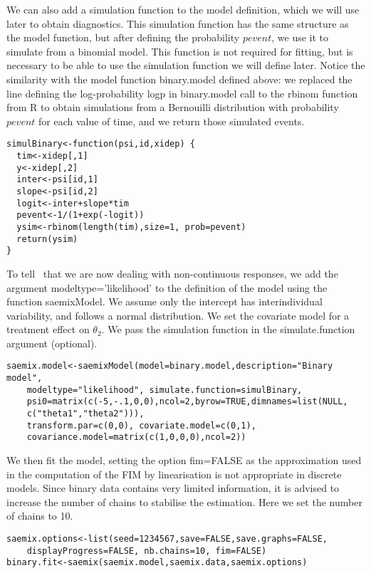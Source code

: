 We can also add a simulation function to the model definition, which we will use later to obtain diagnostics. This simulation function has the same structure as the model function, but after defining the probability $pevent$, we use it to simulate from a binomial model. This function is not required for fitting, but is necessary to be able to use the simulation function we will define later. Notice the similarity with the model function {\sf binary.model} defined above: we replaced the line defining the log-probability {\sf logp} in {\sf binary.model}  call to the {\sf rbinom} function from {\sf R} to obtain simulations from a Bernouilli distribution with probability $pevent$ for each value of time, and we return those simulated events.
\begin{verbatim}
simulBinary<-function(psi,id,xidep) {
  tim<-xidep[,1]
  y<-xidep[,2]
  inter<-psi[id,1]
  slope<-psi[id,2]
  logit<-inter+slope*tim
  pevent<-1/(1+exp(-logit))
  ysim<-rbinom(length(tim),size=1, prob=pevent)
  return(ysim)
}
\end{verbatim}

To tell \saemix~that we are now dealing with non-continuous responses, we add the argument {\sf modeltype='likelihood'} to the definition of the model using the function {\sf saemixModel}. We assume only the intercept has interindividual variability, and follows a normal distribution. We set the covariate model for a treatment effect on $\theta_2$. We pass the simulation function in the {\sf simulate.function} argument (optional).
\begin{verbatim}
saemix.model<-saemixModel(model=binary.model,description="Binary model",
    modeltype="likelihood", simulate.function=simulBinary,
    psi0=matrix(c(-5,-.1,0,0),ncol=2,byrow=TRUE,dimnames=list(NULL,
    c("theta1","theta2"))),
    transform.par=c(0,0), covariate.model=c(0,1),
    covariance.model=matrix(c(1,0,0,0),ncol=2))
\end{verbatim}

We then fit the model, setting the option {\sf fim=FALSE} as the approximation used in the computation of the FIM by linearisation is not appropriate in discrete models. Since binary data contains very limited information, it is advised to increase the number of chains to stabilise the estimation. Here we set the number of chains to 10.
\begin{verbatim}
saemix.options<-list(seed=1234567,save=FALSE,save.graphs=FALSE, 
    displayProgress=FALSE, nb.chains=10, fim=FALSE)
binary.fit<-saemix(saemix.model,saemix.data,saemix.options)
\end{verbatim}

